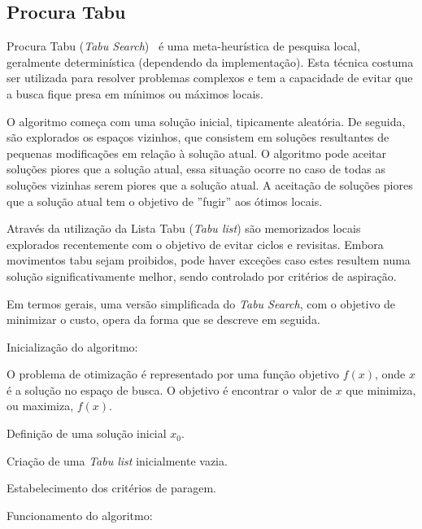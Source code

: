 \subsection{Procura Tabu}
\label{explic:tabu-search}

Procura Tabu (\textit{Tabu Search})~\cite{MetaheuristicsDesignImplementation-Talbi-2009} é uma meta-heurística de pesquisa local, geralmente determinística (dependendo da implementação). Esta técnica costuma ser utilizada para resolver problemas complexos e tem a capacidade de evitar que a busca fique presa em mínimos ou máximos locais.

O algoritmo começa com uma solução inicial, tipicamente aleatória. De seguida, são explorados os espaços vizinhos, que consistem em soluções resultantes de pequenas modificações em relação à solução atual. O algoritmo pode aceitar soluções piores que a solução atual, essa situação ocorre no caso de todas as soluções vizinhas serem piores que a solução atual. A aceitação de soluções piores que a solução atual tem o objetivo de ''fugir'' aos ótimos locais.

Através da utilização da Lista Tabu (\textit{Tabu list}) são memorizados locais explorados recentemente com o objetivo de evitar ciclos e revisitas. Embora movimentos tabu sejam proibidos, pode haver exceções caso estes resultem numa solução significativamente melhor, sendo controlado por critérios de aspiração.

Em termos gerais, uma versão simplificada do \textit{Tabu Search}, com o objetivo de minimizar o custo, opera da forma que se descreve em seguida.

Inicialização do algoritmo:

\begin{compactitem}
    \item O problema de otimização é representado por uma função objetivo $f(x)$, onde $x$ é a solução no espaço de busca. O objetivo é encontrar o valor de $x$ que minimiza, ou maximiza, $f(x)$.

    \item Definição de uma solução inicial $x_0$.
    
    \item Criação de uma \textit{Tabu list} inicialmente vazia.

    \item Estabelecimento dos critérios de paragem.
\end{compactitem}

Funcionamento do algoritmo:

